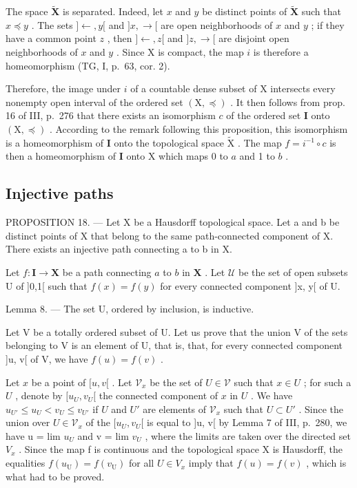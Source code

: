 The space \(\widetilde{\mathbf{X}}\) is separated. Indeed, let \(x\) and \(y\) be distinct points of \(\widetilde{\mathbf{X}}\) such that \(x \preccurlyeq y\) . The sets \(]\leftarrow, y[\) and \(]x, \rightarrow[\) are open neighborhoods of \(x\) and \(y\) ; if they have a common point \(z\) , then \(]\leftarrow, z[\) and \(]z, \rightarrow[\) are disjoint open neighborhoods of \(x\) and \(y\) . Since X is compact, the map \(i\) is therefore a homeomorphism (TG, I, p.~63, cor. 2).

Therefore, the image under \(i\) of a countable dense subset of X intersects every nonempty open interval of the ordered set \((\mathrm{X}, \preccurlyeq)\) . It then follows from prop. 16 of III, p.~276 that there exists an isomorphism \(c\) of the ordered set \(\mathbf{I}\) onto \((\mathrm{X}, \preccurlyeq)\) . According to the remark following this proposition, this isomorphism is a homeomorphism of \(\mathbf{I}\) onto the topological space \(\widetilde{\mathrm{X}}\) . The map \(f = i^{-1} \circ c\) is then a homeomorphism of \(\mathbf{I}\) onto X which maps 0 to \(a\) and 1 to \(b\) .

\subsection{Injective paths}

PROPOSITION 18. --- Let X be a Hausdorff topological space. Let a and b be distinct points of X that belong to the same path-connected component of X. There exists an injective path connecting a to b in X.

Let \(f \colon \mathbf{I} \to \mathbf{X}\) be a path connecting \(a\) to \(b\) in \(\mathbf{X}\) . Let \(\mathcal{U}\) be the set of open subsets \(\mathrm{U}\) of {]}0,1{[} such that \(f(x) = f(y)\) for every connected component {]}x, y{[} of U.

Lemma 8. --- The set U, ordered by inclusion, is inductive.

Let V be a totally ordered subset of U. Let us prove that the union V of the sets belonging to V is an element of U, that is, that, for every connected component {]}u, v{[} of V, we have \(f(u) = f(v)\) .

Let \(x\) be a point of \([u, v[\) . Let \(\mathcal{V}_x\) be the set of \(U \in \mathcal{V}\) such that \(x \in U\) ; for such a \(U\) , denote by \([u_U, v_U[\) the connected component of \(x\) in \(U\) . We have \(u_{U'} \leqslant u_U < v_U \leqslant v_{U'}\) if \(U\) and \(U'\) are elements of \(\mathcal{V}_x\) such that \(U \subset U'\) . Since the union over \(U \in \mathcal{V}_x\) of the \([u_U, v_U[\) is equal to {]}u, v{[} by Lemma 7 of III, p.~280, we have u = lim \(u_{U}\) and v = lim \(v_{U}\) , where the limits are taken over the directed set \(V_{x}\) . Since the map f is continuous and the topological space X is Hausdorff, the equalities \(f(u_{\mathrm{U}}) = f(v_{\mathrm{U}})\) for all \(U \in V_{x}\) imply that \(f(u) = f(v)\) , which is what had to be proved.

